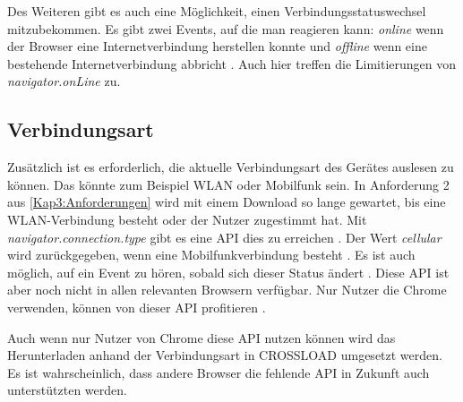 Des Weiteren gibt es auch eine Möglichkeit, einen Verbindungsstatuswechsel mitzubekommen. Es gibt zwei Events, auf die man reagieren kann: \emph{online} wenn der Browser eine Internetverbindung herstellen konnte und \emph{offline} wenn eine bestehende Internetverbindung abbricht \autocite{mdn-online} \autocite{Freeman2020}. Auch hier treffen die Limitierungen von \emph{navigator.onLine} zu.

\subsection{Verbindungsart}
Zusätzlich ist es erforderlich, die aktuelle Verbindungsart des Gerätes auslesen zu können. Das könnte zum Beispiel WLAN oder Mobilfunk sein. In Anforderung 2 aus \autoref{Kap3:Anforderungen} wird mit einem Download so lange gewartet, bis eine WLAN-Verbindung besteht oder der Nutzer zugestimmt hat. Mit \emph{navigator.connection.type} gibt es eine \ac{API} dies zu erreichen \autocite{network-type-mdn}. Der Wert \textit{cellular} wird zurückgegeben, wenn eine Mobilfunkverbindung besteht \autocite{network-type-mdn}. Es ist auch möglich, auf ein Event zu hören, sobald sich dieser Status ändert \autocite{network-information-mdn}. Diese \ac{API} ist aber noch nicht in allen relevanten Browsern verfügbar. Nur Nutzer die Chrome verwenden, können von dieser \ac{API} profitieren \autocite{network-type-mdn}.

Auch wenn nur Nutzer von Chrome diese \ac{API} nutzen können wird das Herunterladen anhand der Verbindungsart in CROSSLOAD umgesetzt werden. Es ist wahrscheinlich, dass andere Browser die fehlende \ac{API} in Zukunft auch unterstützten werden.

